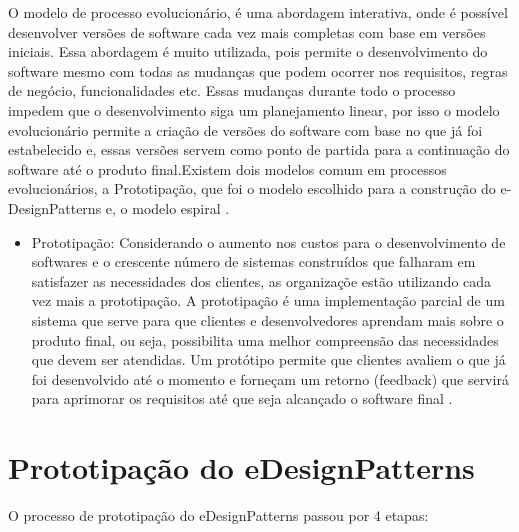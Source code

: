 O modelo de processo evolucionário, é uma abordagem interativa, onde é possível desenvolver versões de software cada vez mais completas com base em versões iniciais. Essa abordagem é muito utilizada, pois permite o desenvolvimento do software  mesmo com todas as mudanças que podem ocorrer nos requisitos, regras de negócio, funcionalidades etc. Essas mudanças durante todo o processo impedem que o desenvolvimento siga um planejamento linear, por isso o modelo evolucionário permite a criação de versões do software com base no que já foi estabelecido e, essas versões servem como ponto de partida para a continuação do software até o produto final.Existem dois modelos comum em processos evolucionários, a Prototipação, que foi o modelo escolhido para a construção do e-DesignPatterns e, o modelo espiral \cite{pressman2016engenharia}. 


\begin{itemize}
	\item Prototipação: Considerando o aumento nos custos para o desenvolvimento de softwares e o crescente número de sistemas construídos que falharam em satisfazer as necessidades dos clientes, as organizaçõe estão utilizando cada vez mais a prototipação. A prototipação é  uma implementação parcial de um sistema que serve para que clientes e desenvolvedores aprendam mais sobre o produto final, ou seja, possibilita uma melhor compreensão das necessidades que devem ser atendidas. Um protótipo permite que clientes avaliem o que já foi desenvolvido até o momento e forneçam um retorno (feedback) que servirá para aprimorar os requisitos até que seja alcançado o software final \cite{davis1992operational}. 
\end{itemize}

\section{Prototipação do eDesignPatterns}

O processo de prototipação do eDesignPatterns passou por 4 etapas:

